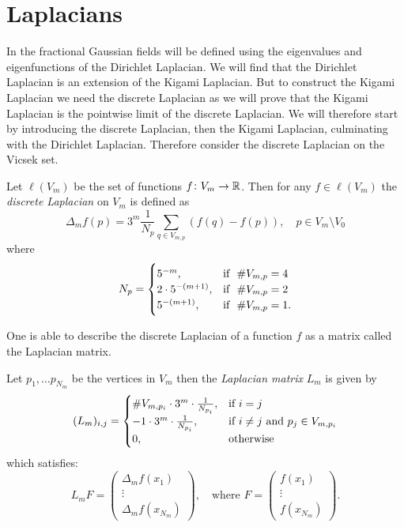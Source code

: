 \setlength\beforechapskip{-1em}
\chapter{Laplacians}
In   the fractional Gaussian fields will be defined using the eigenvalues and eigenfunctions of the Dirichlet Laplacian. We will find that the Dirichlet Laplacian is an extension of the Kigami Laplacian. But to construct the Kigami Laplacian we need the discrete Laplacian as we will prove that the Kigami Laplacian is the pointwise limit of the discrete Laplacian. We will therefore start by introducing the discrete Laplacian, then the Kigami Laplacian, culminating with the Dirichlet Laplacian. Therefore consider the discrete Laplacian on the Vicsek set.

\medskip
\begin{defi}\label{discreteLaplacian}
	Let $\ell(V_m)$ be the set of functions $f\colon V_m \to \mathbb{R}$. Then for any $f \in \ell(V_m)$  the \emph{discrete Laplacian} on $V_m$ is defined as
	\begin{equation}
		\Delta_m f(p) = 3^{m} \frac{1}{N_p}\sum_{q \in V_{m,p}} (f(q) - f(p)), \quad p \in V_m \setminus V_0
	\end{equation}
	where $$N_p = \begin{cases}
		5^{-m}, & \text{if } \ \# V_{m,p} = 4 \\
		2\cdot 5^{-(m+1)}, & \text{if } \ \# V_{m,p} = 2\\
		5^{-(m+1)},  & \text{if } \ \# V_{m,p} = 1.
	\end{cases}$$
\end{defi}

\medskip
One is able to describe the discrete Laplacian of a function $f$ as a matrix called the Laplacian matrix.
\medskip
\begin{defi}\label{discreteMatrix}
	 Let $p_1, \ldots p_{N_m}$ be the vertices in $V_m$ then the \emph{Laplacian matrix} $L_m$ is given by 
	\begin{equation}
		(L_m)_{i,j} = \begin{cases}
			\#V_{m,p_i} \cdot 3^{m} \cdot\frac{1}{N_{p_i}}, & \text{if } i= j \\
			-1 \cdot 3^{m} \cdot \frac{1}{N_{p_i}}, & \text{if } i \neq j \text{ and } p_j \in V_{m,p_i} \\
			0, & \text{otherwise}
		\end{cases}
	\end{equation}
	which satisfies:
	\begin{equation}
		L_mF = \begin{pmatrix}
			\Delta_m f(x_1)\\
			\vdots \\
			\Delta_{m}f(x_{N_m})
		\end{pmatrix}, \quad \text{where } F = \begin{pmatrix}
			f(x_1)\\
			\vdots \\
			f(x_{N_m})
		\end{pmatrix}.
	\end{equation}
\end{defi}


